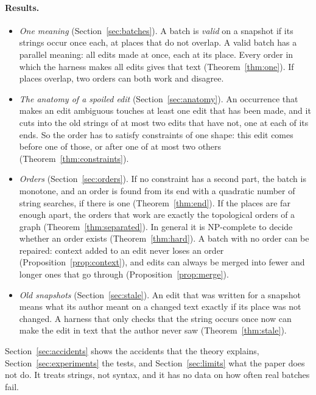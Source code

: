 \documentclass[acmsmall,nonacm,screen]{acmart}
\begin{document}
\paragraph{Results.}
\begin{itemize}
\item \emph{One meaning} (Section~\ref{sec:batches}). A batch is \emph{valid} on a snapshot if
  its strings occur once each, at places that do not overlap. A valid batch has a parallel
  meaning: all edits made at once, each at its place. Every order in which the harness makes
  all edits gives that text (Theorem~\ref{thm:one}). If places overlap, two orders can both
  work and disagree.
\item \emph{The anatomy of a spoiled edit} (Section~\ref{sec:anatomy}). An occurrence that
  makes an edit ambiguous touches at least one edit that has been made, and it cuts into the
  old strings of at most two edits that have not, one at each of its ends. So the order has to
  satisfy constraints of one shape: this edit comes before one of those, or after one of at
  most two others (Theorem~\ref{thm:constraints}).
\item \emph{Orders} (Section~\ref{sec:orders}). If no constraint has a second part, the batch
  is monotone, and an order is found from its end with a quadratic number of string searches,
  if there is one (Theorem~\ref{thm:end}). If the places are far enough apart, the orders that
  work are exactly the topological orders of a graph (Theorem~\ref{thm:separated}). In
  general it is NP-complete to decide whether an order exists (Theorem~\ref{thm:hard}). A
  batch with no order can be repaired: context added to an edit never loses an order
  (Proposition~\ref{prop:context}), and edits can always be merged into fewer and longer
  ones that go through (Proposition~\ref{prop:merge}).
\item \emph{Old snapshots} (Section~\ref{sec:stale}). An edit that was written for a snapshot
  means what its author meant on a changed text exactly if its place was not changed. A
  harness that only checks that the string occurs once now can make the edit in text that the
  author never saw (Theorem~\ref{thm:stale}).
\end{itemize}

Section~\ref{sec:accidents} shows the accidents that the theory explains,
Section~\ref{sec:experiments} the tests, and Section~\ref{sec:limits} what the paper does not
do. It treats strings, not syntax, and it has no data on how often real batches fail.
\end{document}
